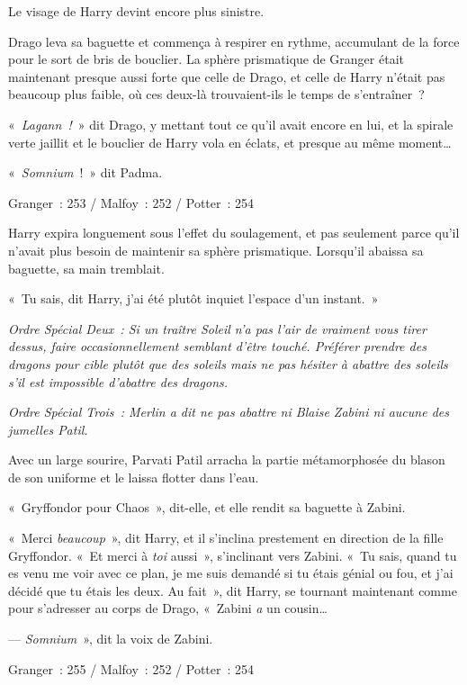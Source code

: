 Le visage de Harry devint encore plus sinistre.

Drago leva sa baguette et commença à respirer en rythme, accumulant de la force pour le sort de bris de bouclier. La sphère prismatique de Granger était maintenant presque aussi forte que celle de Drago, et celle de Harry n'était pas beaucoup plus faible, où ces deux-là trouvaient-ils le temps de s'entraîner~?

«~\emph{Lagann~!}~» dit Drago, y mettant tout ce qu'il avait encore en lui, et la spirale verte jaillit et le bouclier de Harry vola en éclats, et presque au même moment…

«~\emph{Somnium}~!~» dit Padma.

\later

Granger~: 253 / Malfoy~: 252 / Potter~: 254

Harry expira longuement sous l'effet du soulagement, et pas seulement parce qu'il n'avait plus besoin de maintenir sa sphère prismatique. Lorsqu'il abaissa sa baguette, sa main tremblait.

«~Tu sais, dit Harry, j'ai été plutôt inquiet l'espace d'un instant.~»

\emph{Ordre Spécial Deux~: Si un traître Soleil n'a pas l'air de vraiment vous tirer dessus, faire occasionnellement semblant d'être touché. Préférer prendre des dragons pour cible plutôt que des soleils mais ne pas hésiter à abattre des soleils s'il est impossible d'abattre des dragons.}

\emph{Ordre Spécial Trois~: Merlin a dit ne pas abattre ni Blaise Zabini ni aucune des jumelles Patil.}

Avec un large sourire, Parvati Patil arracha la partie métamorphosée du blason de son uniforme et le laissa flotter dans l'eau.

«~Gryffondor pour Chaos~», dit-elle, et elle rendit sa baguette à Zabini.

«~Merci \emph{beaucoup}~», dit Harry, et il s'inclina prestement en direction de la fille Gryffondor. «~Et merci à \emph{toi} aussi~», s'inclinant vers Zabini. «~Tu sais, quand tu es venu me voir avec ce plan, je me suis demandé si tu étais génial ou fou, et j'ai décidé que tu étais les deux. Au fait~», dit Harry, se tournant maintenant comme pour s'adresser au corps de Drago, «~Zabini \emph{a} un cousin…

--- \emph{Somnium}~», dit la voix de Zabini.

\later

Granger~: 255 / Malfoy~: 252 / Potter~: 254

